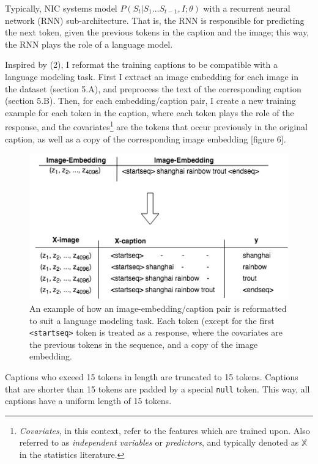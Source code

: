 \documentclass[letterpaper, 10 pt, conference]{ieeeconf}
\begin{document}
Typically, NIC systems model $P(S_t|S_1 ... S_{t-1}, I; \theta)$ with a recurrent neural network (RNN) sub-architecture. That is, the RNN is responsible for predicting the next token, given the previous tokens in the caption and the image; this way, the RNN plays the role of a language model. 

Inspired by (2), I reformat the training captions to be compatible with a language modeling task. First I extract an image embedding for each image in the dataset (section 5.A), and preprocess the text of the corresponding caption (section 5.B). Then, for each embedding/caption pair, I create a new training example for each token in the caption, where each token plays the role of the response, and the  covariates\footnote{\textit{Covariates}, in this context, refer to the features which are trained upon. Also referred to as \textit{independent variables} or \textit{predictors}, and typically denoted as $\mathbb{X}$ in the statistics literature.} are the tokens that occur previously in the original caption, as well as a copy of the corresponding image embedding [figure 6].

\begin{figure}[H]
\centering
\includegraphics[width=1\linewidth]{caption_expand}
\caption{An example of how an image-embedding/caption pair is reformatted to suit a language modeling task. Each token (except for the first \texttt{<startseq>} token is treated as a response, where the covariates are the previous tokens in the sequence, and a copy of the image embedding.}
\label{fig:test1}
\end{figure}

Captions who exceed 15 tokens in length are truncated to 15 tokens. Captions that are shorter than 15 tokens are padded by a special \texttt{null} token. This way, all captions have a uniform length of 15 tokens.
\end{document}
